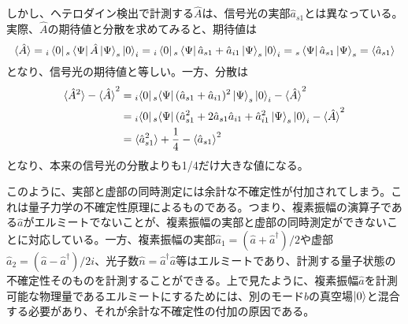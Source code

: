 しかし、ヘテロダイン検出で計測する$\hat A$は、信号光の実部$\hat a_{s1}$とは異なっている。実際、$\hat A$の期待値と分散を求めてみると、期待値は
\begin{equation}
  \braket{\hat A} = {}_i\bra{0}{}_s\bra{\Psi}\hat A\ket\Psi _s\ket 0_i = {}_i\bra{0}{}_s\bra{\Psi}\hat a_{s1} + \hat a_{i1}\ket\Psi _s\ket 0_i = {}_s\bra{\Psi}\hat a_{s1}\ket\Psi _s = \braket{\hat a_{s1}}
\end{equation}
となり、信号光の期待値と等しい。一方、分散は
\begin{equation}
  \begin{aligned}
  	\braket{\hat A^2} - \braket{\hat A}^2 &= {}_i\!\bra{0}{}_s\!\bra{\Psi}(\hat a_{s1} + \hat a_{i1})^2 \ket\Psi _s\ket 0_i - \braket{\hat A}^2 \\
  	&= {}_i\!\bra{0}{}_s\!\bra{\Psi}(\hat a_{s1}^2 + 2\hat a_{s1}\hat a_{i1} + \hat a_{i1}^2 \ket\Psi _s\ket 0_i - \braket{\hat A}^2 \\
  	&= \braket {\hat a_{s1}^2} + \frac 1 4 - \braket{\hat a_{s1}}^2 \\
  \end{aligned}
\end{equation}
となり、本来の信号光の分散よりも1/4だけ大きな値になる。


このように、実部と虚部の同時測定には余計な不確定性が付加されてしまう。これは量子力学の不確定性原理によるものである。つまり、複素振幅の演算子である$\hat a$がエルミートでないことが、複素振幅の実部と虚部の同時測定ができないことに対応している。一方、複素振幅の実部$\hat a_1 = (\hat a + \hat a^\dagger) / 2$や虚部$\hat a_2 = (\hat a - \hat a^\dagger)/2i$、光子数$\hat n = \hat a^\dagger \hat a$等はエルミートであり、計測する量子状態の不確定性そのものを計測することができる。上で見たように、複素振幅$\hat a$を計測可能な物理量であるエルミートにするためには、別のモード$\hat b$の真空場$\ket 0$と混合する必要があり、それが余計な不確定性の付加の原因である。




